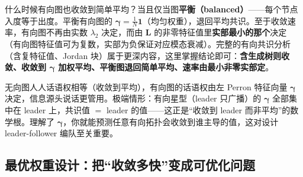什么时候有向图也收敛到简单平均？当且仅当图\textbf{平衡（balanced）}——每个节点入度等于出度。平衡有向图的 $\boldsymbol{\gamma}=\tfrac1N\mathbf{1}$（均匀权重），退回平均共识。至于收敛速率，有向图不再由实数 $\lambda_2$ 决定，而由 $\mathbf{L}$ 的非零特征值里\textbf{实部最小的那个}决定（有向图特征值可为复数，实部为负保证对应模态衰减）。完整的有向共识分析（含复特征值、Jordan 块）属于更深内容，这里掌握结论即可：\textbf{含生成树则收敛、收敛到 $\boldsymbol{\gamma}$ 加权平均、平衡图退回简单平均、速率由最小非零实部定}。

\begin{insight}[有向图打破了共识的“民主”]\label{ins:cs-directed}
无向图人人话语权相等（收敛到平均），有向图的话语权由左 Perron 特征向量 $\boldsymbol{\gamma}$ 决定，信息源头说话更管用。极端情形：有向星型（leader 只广播）的 $\boldsymbol{\gamma}$ 全部集中在 leader 上，共识值 $=$ leader 的值——这正是“收敛到 leader 而非平均”的数学根。理解了 $\boldsymbol{\gamma}$，你就能预测任意有向拓扑会收敛到谁主导的值，这对设计 leader-follower 编队至关重要。
\end{insight}

\subsection{最优权重设计：把“收敛多快”变成可优化问题}
\label{sec:cs-fdla}

